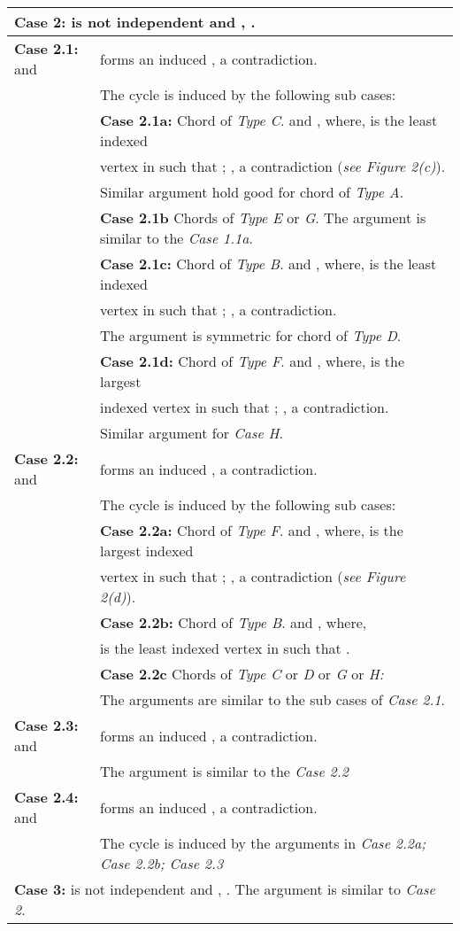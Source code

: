 \documentclass[runningheads]{llncs}
\begin{document}
\begin{table}[H]
\begin{tabular}{|l|l|}
\multicolumn{2}{l}{\textbf{Case 2:}  is not independent and , .} \\ \hline
\textbf{Case 2.1:}  and  &  forms an induced , a contradiction. \\
&	The cycle is induced by the following sub cases:\\ \cline{2-2}

&	\textbf{Case 2.1a:} Chord of \emph{Type C}.  and , where,  is the least indexed \\
& vertex in  such that ; , a contradiction (\emph{see Figure 2(c)}). \\
&	Similar argument hold good for chord of \emph{Type A}. \\ \cline{2-2}
&	\textbf{Case 2.1b} Chords of \emph{Type E} or \emph{G}.	The argument is similar to the \emph{Case 1.1a}. \\ \cline{2-2}
&	\textbf{Case 2.1c:} Chord of \emph{Type B}.  and , where,  is the least indexed \\
 & vertex in  such that ; , a contradiction. \\ 
 & The argument is symmetric for chord of \emph{Type D}.\\ \cline{2-2}
 & \textbf{Case 2.1d:} Chord of \emph{Type F}.   and , where,  is the largest \\
 & indexed vertex in  such that ; , a contradiction.\\ 
 & Similar argument for \emph{Case H}.\\ \hline
\textbf{Case 2.2:}  and  &  forms an induced , a contradiction. \\ 
&The cycle is induced by the following sub cases:\\ \cline{2-2}

& \textbf{Case 2.2a:} Chord of \emph{Type F}.  and , where,  is the largest indexed \\ 
& vertex in  such that ; , a contradiction (\emph{see Figure 2(d)}). \\ \cline{2-2}
& \textbf{Case 2.2b:} Chord of \emph{Type B}.   and , where, \\ 
 &  is the least indexed vertex in  such that . \\ \cline{2-2}
&\textbf{Case 2.2c} Chords of \emph{Type C} or \emph{D} or \emph{G} or \emph{H:}\\
&  The arguments are similar to the sub cases of \emph{Case 2.1}. \\ \hline
\textbf{Case 2.3:}  and  &  forms an induced , a contradiction. \\
  & The argument is similar to the \emph{Case 2.2}\\ \hline
\textbf{Case 2.4:}  and  &  forms an induced , a contradiction. \\ 
& The cycle is induced by the arguments in \emph{Case 2.2a; Case 2.2b; Case 2.3}\\ \hline
\multicolumn{2}{|l|}{\textbf{Case 3:}  is not independent and , . The argument is similar to \emph{Case 2}.} \\ \hline


\end{tabular}
\end{table}
\end{document}
